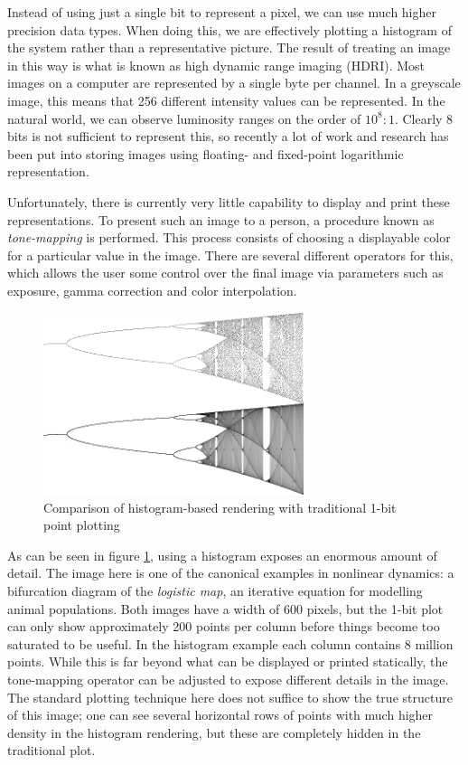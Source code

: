 \documentclass[letterpaper, 11pt]{article}
\begin{document}
Instead of using just a single bit to represent a pixel, we can use much higher precision
data types.  When doing this, we are effectively plotting a histogram of the system rather
than a representative picture. The result of treating an image in this way is what is known
as high dynamic range imaging (HDRI).  Most images on a computer are represented by a single
byte per channel.  In a greyscale image, this means that 256 different intensity values
can be represented.  In the natural world, we can observe luminosity ranges on the order of
$10^8:1$.  Clearly 8 bits is not sufficient to represent this, so recently a lot of work
and research has been put into storing images using floating- and fixed-point logarithmic
representation.

Unfortunately, there is currently very little capability to display and print these
representations.  To present such an image to a person, a procedure known as
\emph{tone-mapping} is performed.  This process consists of choosing a displayable color for
a particular value in the image.  There are several different operators for this, which
allows the user some control over the final image via parameters such as exposure, gamma
correction and color interpolation.

\begin{figure}[htb]
\centering
\includegraphics[width=3in]{figures/logistic-combined.png}
\caption{Comparison of histogram-based rendering with traditional 1-bit point plotting\label{logistic}}
\end{figure}

As can be seen in figure \ref{logistic}, using a histogram exposes an enormous amount of
detail.  The image here is one of the canonical examples in nonlinear dynamics: a bifurcation
diagram of the \emph{logistic map}, an iterative equation for modelling animal populations.
Both images have a width of 600 pixels, but the 1-bit plot can only show approximately 200
points per column before things become too saturated to be useful.  In the histogram example
each column contains 8 million points.  While this is far beyond what can be displayed or
printed statically, the tone-mapping operator can be adjusted to expose different details
in the image.  The standard plotting technique here does not suffice to show the true structure
of this image;  one can see several horizontal rows of points with much higher density in
the histogram rendering, but these are completely hidden in the traditional plot.
\end{document}
